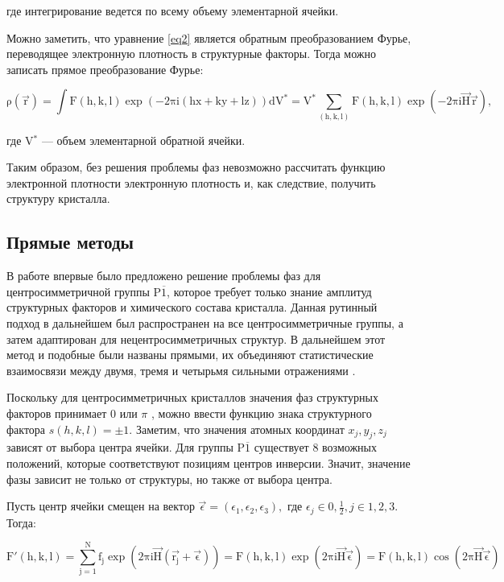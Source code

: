 где интегрирование ведется по всему объему элементарной ячейки.

Можно заметить, что уравнение \ref{eq2} является обратным преобразованием Фурье, переводящее электронную плотность в структурные факторы. Тогда можно записать прямое преобразование Фурье:

\begin{equation}\label{eq21}
\mathrm{ 
\rho(\overrightarrow{r}) = \int F(h,k,l) \exp (-2\pi i (hx+ky+lz))dV^* = V^* \sum\limits_{(h,k,l)} F(h,k,l) \exp(-2\pi i \overrightarrow{H}\overrightarrow{r})},
\end{equation}

где V$^*$ --- объем элементарной обратной ячейки.

Таким образом, без решения проблемы фаз невозможно рассчитать функцию электронной плотности электронную плотность и, как следствие, получить структуру кристалла.

\subsection{Прямые методы}

В работе \cite{hauptman_solution_1954} впервые было предложено решение проблемы фаз для центросимметричной группы P$\overline{1}$, которое требует только знание амплитуд структурных факторов и химического состава кристалла. Данная рутинный подход в дальнейшем был распространен на все центросимметричные группы, а затем адаптирован для нецентросимметричных структур. В дальнейшем этот метод и подобные были названы прямыми, их объединяют статистические взаимосвязи между двумя, тремя и четырьмя сильными отражениями \cite{hauptman_direct_1986}. 

Поскольку для центросимметричных кристаллов значения фаз структурных факторов принимает 0 или $\pi$ \cite{cowtan_phase_2003}, можно ввести функцию знака структурного фактора $s(h,k,l) = \pm 1$. Заметим, что значения атомных координат $x_j, y_j, z_j$ зависят от выбора центра ячейки. Для группы P$\overline{1}$ существует 8 возможных положений, которые соответствуют позициям центров инверсии. Значит, значение фазы зависит не только от структуры, но также от выбора центра.

Пусть центр ячейки смещен на вектор $\overrightarrow{\epsilon} = (\epsilon_1, \epsilon_2, \epsilon_3),$ где $\epsilon_j \in {0, \frac{1}{2}}, j \in {1,2,3}$. Тогда:

\begin{equation}\label{eq3}
\mathrm{ 
F'(h,k,l) = \sum\limits_{j=1}^N f_j \exp(2\pi i\overrightarrow{H}(\overrightarrow{r_j}+\overrightarrow{\epsilon})) = F(h,k,l) \exp(2\pi i\overrightarrow{H}\overrightarrow{\epsilon}) = F(h,k,l) \cos (2\pi \overrightarrow{H}\overrightarrow{\epsilon})}
\end{equation}

